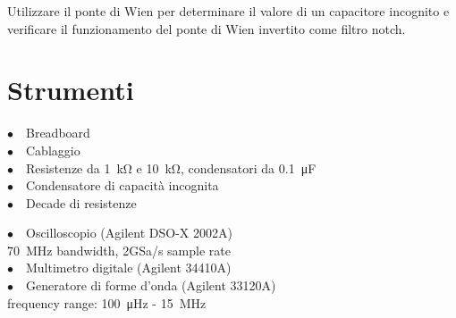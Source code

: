 
Utilizzare il ponte di Wien per determinare il valore di un capacitore incognito e verificare il funzionamento del ponte di Wien invertito come filtro notch.

\section{Strumenti}
%
\phantom{porcodio!}
\noindent
\begin{minipage}{.5\linewidth}
$\bullet \quad$Breadboard\\
$\bullet \quad$Cablaggio\\
$\bullet \quad$Resistenze da \SI{1}{\kilo\ohm} e \SI{10}{\kilo\ohm}, condensatori da \SI{0.1}{\micro\farad}\\
$\bullet \quad$Condensatore di capacità incognita\\
$\bullet \quad$Decade di resistenze\\
\end{minipage}%
\begin{minipage}{.5\linewidth}
$\bullet \quad$Oscilloscopio (Agilent DSO-X 2002A)\\
\phantom{xxxx}\SI{70}{\mega\hertz} bandwidth, 2GSa/s sample rate\\
$\bullet \quad$Multimetro digitale (Agilent 34410A)\\
$\bullet \quad$Generatore di forme d'onda (Agilent 33120A)\\
\phantom{xxxx}frequency range: \SI{100}{\micro\hertz} - \SI{15}{\mega\hertz}\\
\end{minipage}
